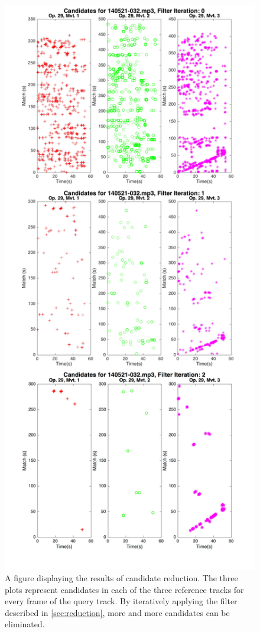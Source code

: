 \documentclass{article}
\begin{document}
\begin{figure}
\includegraphics[width=\linewidth]{figs/Stepwise.jpg}
\caption{A figure displaying the results of candidate reduction. The three plots represent candidates in each of the three reference tracks for every frame of the query track. By iteratively applying the filter described in \ref{sec:reduction}, more and more candidates can be eliminated.}
\label{fig:reduction}
\end{figure}
\end{document}

